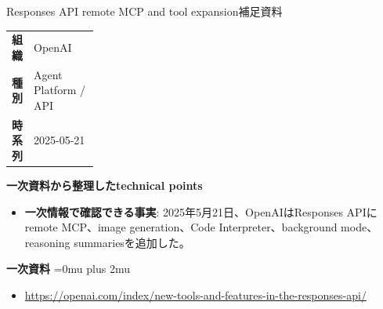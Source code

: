 \begin{technicalnote}{Responses API remote MCP and tool expansion}{補足資料}
\begingroup
\begin{tabularx}{\linewidth}{@{}>{\bfseries}p{0.22\linewidth}X@{}}
組織 & OpenAI \\
種別 & Agent Platform / API \\
時系列 & 2025-05-21 \\
\end{tabularx}
\smallskip
{\bfseries 一次資料から整理したtechnical points}
\begin{itemize}[leftmargin=1.5em,itemsep=0.35em]
\item \textbf{一次情報で確認できる事実}: 2025年5月21日、OpenAIはResponses APIにremote MCP、image generation、Code Interpreter、background mode、reasoning summariesを追加した。
\end{itemize}
\begin{samepage}
{\bfseries 一次資料}
\begingroup\sloppy
\Urlmuskip=0mu plus 2mu\relax
\begin{itemize}[leftmargin=1.5em,itemsep=0.25em]
\item {\scriptsize\url{https://openai.com/index/new-tools-and-features-in-the-responses-api/}}
\end{itemize}
\endgroup
\end{samepage}
\endgroup
\end{technicalnote}
\medskip
